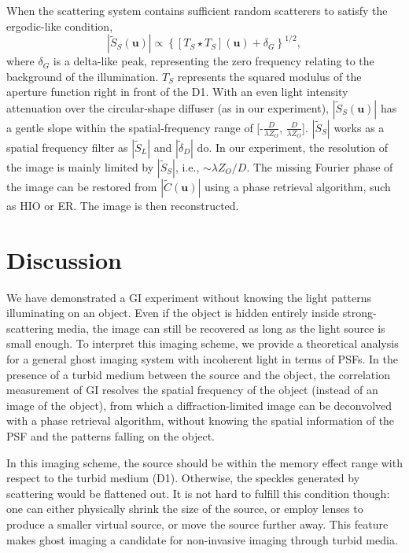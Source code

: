 \documentclass[amsmath,amssymb,aps,prl,groupedaddress,floatfix,12pt]{revtex4-1}
\begin{document}
When the scattering system contains sufficient random scatterers to satisfy the ergodic-like condition\cite{Freund1990Looking,Yuan_2020}, 
\begin{equation}\label{eq:PSF_FD}
      |\tilde{S}_S({\boldsymbol{u}})|\propto \left\{ [T_S\star T_S]({\boldsymbol{u}})+ \delta_G \right\}^{1/2},
\end{equation} 
where $\delta_G$ is a delta-like peak, representing the zero frequency relating to the background of the illumination. $T_S$ represents the squared modulus of the aperture function right in front of the D1. With an even light intensity attenuation over the circular-shape diffuser (as in our experiment), $|\tilde{S}_S({\boldsymbol{u}})|$ has a gentle slope within the  spatial-frequency range of [-$\frac{D}{\lambda Z_{O}}$, $\frac{D}{\lambda Z_{O}}$]\cite{Yuan_2020}. 
$|\tilde{S}_S|$ works as a spatial frequency filter as $|\tilde{S}_{L}|$ and $|\tilde{\delta}_{D}|$ do. In our experiment, the resolution of the image is mainly limited by  $|\tilde{S}_S|$, i.e., $\sim \lambda Z_{O}/D$.  
The missing Fourier phase of the image can be restored from $|\tilde{C}({\boldsymbol u})|$ using a phase retrieval algorithm, such as HIO or ER\cite{Fienup1978Reconstruction}. The image is then reconstructed. 




\section{Discussion}
We have demonstrated a GI experiment without knowing the light patterns illuminating on an object. Even if the object is hidden entirely inside strong-scattering media, the image can still be recovered as long as the light source is small enough. To interpret this imaging scheme, we provide a theoretical analysis for a general ghost imaging system with incoherent light in terms of PSFs. In the presence of a turbid medium between the source and the object, the correlation measurement of GI resolves the spatial frequency of the object (instead of an image of the object), from which a diffraction-limited image can be deconvolved with a phase retrieval algorithm, without knowing  the spatial information of the PSF and the patterns falling on the object. 

In this imaging scheme, the source should be within the memory effect range with respect to the turbid medium (D1). Otherwise, the speckles generated by scattering would be flattened out. It is not hard to fulfill this condition though: one can either physically shrink the size of the source, or employ lenses to produce a smaller virtual source, or move the source further away. This feature makes ghost imaging a candidate for non-invasive imaging through turbid media. 
\end{document}
